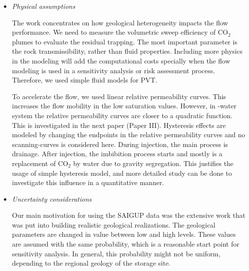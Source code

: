 {\begin{itemize}
This paper is presented in ECMOR conference in Oxford, 2010. This is a
complementary to proceedings works presented in ACM Edinburgh, 2009 and CMWR in
Barcelona, 2010. 

Topography is a major player in the gravity dominated flow behavior. The SAIGUP
realizations include variability in topography of the geological layering via
structural changes due to faults and also barriers in the model. These are good
enough for early migration when the $\mbox{CO}_2$ and water segregate and plumes
accumulate below cap-rock and start the longer migration. In the long-term
migration, top surface geometry is an important geological parameter and
larger models than the SAIGUP models with a better resolution of the top surface
are needed to get good predictions of the long-term migration phase. This
was considered in the next generation of geological studies performed following
this study \cite{syversveenstudy,nilsen2012impact} under the IGEMS research
project.

\item \textit{Physical assumptions}
 
The work concentrates on how geological heterogeneity impacts the flow
performance. We need to measure the volumetric sweep efficiency of $\mbox{CO}_2$
plumes to evaluate the residual trapping. The most important parameter
is the rock transmissibility, rather than fluid properties. Including more
physics in the modeling will add the computational costs specially when the flow
modeling is used in a sensitivity analysis or risk assessment process.
Therefore, we used simple fluid models for PVT. 

To accelerate the flow, we used linear relative permeability curves. This
increases the flow mobility in the low saturation values. However, in \coo-water system the relative permeability curves are closer to a quadratic function. This is investigated in the next paper (Paper III). Hysteresis effects are
modeled by changing the endpoints in the relative permeability curves and no
scanning-curves is considered here. During injection, the main process is
drainage. After injection, the imbibition process starts and mostly is a
replacement of $\mbox{CO}_2$ by water due to gravity segregation. This justifies
the usage of simple hysteresis model, and more detailed study can be done to
investigate this influence in a quantitative manner. 

\item \textit{Uncertainty considerations}

Our main motivation for using the SAIGUP data was the extensive work that was put into building realistic geological realizations. The geological parameters are changed in value between low and high levels. These values are assumed with the same probability, which is a reasonable start point for sensitivity analysis. In general, this probability might not be uniform, depending to the regional geology of the storage site. 

\end{itemize}
}%



